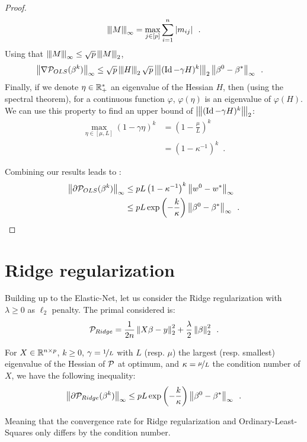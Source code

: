 \documentclass[../main.tex]{subfiles}
\begin{document}
\begin{proof}
\begin{align*}
\tnorm{M}_\infty = \max_{j\in [p]} \sum_{i=1}^n \abs{m_{ij}} \enspace.
\end{align*}
Using that $\tnorm{M}_\infty \leq \sqrt{p} \tnorm{M}_2$,
\begin{align*}
    \norm{\nabla \cP_{OLS}(\beta^k)}_\infty
    & \leq \sqrt{p}\tnorm{H}_2 \sqrt{p}\tnorm{(\Id - \gamma H)^k}_2
           \norm{\beta^0 - \beta^*}_\infty
    \enspace.
\end{align*}
Finally, if we denote $\eta\in\mathbb{R}_+^*$ an eigenvalue of the Hessian $H$, then
(using the spectral theorem),
for a continuous function $\varphi$, $\varphi(\eta)$ is an eigenvalue of
$\varphi(H)$. We can use this property to find an upper bound of
$\tnorm{(\Id - \gamma H)^k}_2$:
\begin{align*}
    \max_{\eta \in [\mu, L]}(1-\gamma \eta)^k
    & = \left(1-\frac{\mu}{L}\right)^k \\
    & = \left(1- \kappa^{-1}\right)^k
    \enspace.
\end{align*}

Combining our results leads to :
\begin{align*}
\left \lVert \partial\mathcal{P}_{OLS}(\beta^k) \right \rVert_{\infty}
& \leq p L \left(1- \kappa^{-1}\right)^k \left \lVert w^0 - w^* \right \rVert_\infty \\
& \leq pL \exp\left(-\frac{k}{\kappa}\right) \left \lVert \beta^0 - \beta^* \right \rVert_\infty
\enspace.
\end{align*}
\end{proof}

\section{Ridge regularization}
\label{sec:ridge_regularization}

Building up to the Elastic-Net, let us consider the Ridge regularization with
$\lambda\geq 0$ as $\ell_2$ penalty.
The primal considered is:
\begin{align}
    \mathcal{P}_{Ridge} = \frac{1}{2n}\left \lVert X\beta-y \right \rVert_2^2 + \frac{\lambda}{2}\left \lVert \beta \right \rVert_2^2
    \enspace.
\end{align}

\begin{proposition}\label{prop:ridge_kkt}
    For $X\in\mathbb{R}^{n\times p}$, $k\geq 0$, $\gamma = \nicefrac{1}{L}$
    with $L$ (resp. $\mu$) the largest (resp. smallest) eigenvalue of
    the Hessian of $\mathcal{P}$ at optimum, and $\kappa=\nicefrac{\mu}{L}$ the condition
    number of $X$, we have the following inequality:
    \begin{align}
    \left \lVert \partial\mathcal{P}_{Ridge}(\beta^k) \right \rVert_{\infty}
    \leq pL \exp\left(-\frac{k}{\kappa}\right) \left \lVert \beta^0 - \beta^* \right \rVert_\infty
    \enspace.
    \end{align}
\end{proposition}
Meaning that the convergence rate for Ridge regularization and Ordinary-Least-Squares
only differs by the condition number.
\end{document}
